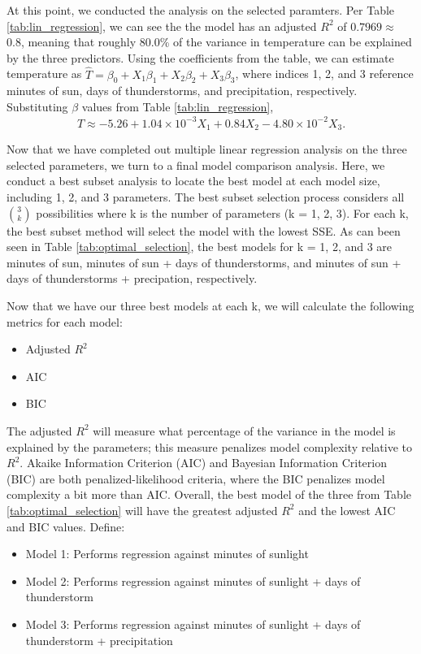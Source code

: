 At this point, we conducted the analysis on the selected paramters. Per Table \ref{tab:lin_regression}, we can see the the model has an adjusted $R^{2}$ of $0.7969 \approx$ 0.8, meaning that roughly 80.0\% of the variance in temperature can be explained by the three predictors. Using the coefficients from the table, we can estimate temperature as $\hat{T} = \beta_{0} + X_{1}\beta_{1} + X_{2}\beta_{2} + X_{3}\beta_{3}$, where indices 1, 2, and 3 reference minutes of sun, days of thunderstorms, and precipitation, respectively. Substituting $\beta$ values from Table \ref{tab:lin_regression}, $$\hat{T} \approx -5.26 + 1.04 \times 10^{-3}X_{1} + 0.84X_{2} - 4.80\times 10^{-2}X_{3}.$$

Now that we have completed out multiple linear regression analysis on the three selected parameters, we turn to a final model comparison analysis. Here, we conduct a best subset analysis to locate the best model at each model size, including 1, 2, and 3 parameters. The best subset selection process considers all $3 \choose k$ possibilities where k is the number of parameters (k = 1, 2, 3). For each k, the best subset method will select the model with the lowest SSE. As can been seen in Table \ref{tab:optimal_selection}, the best models for k = 1, 2, and 3 are minutes of sun, minutes of sun + days of thunderstorms, and minutes of sun + days of thunderstorms + precipation, respectively.

Now that we have our three best models at each k, we will calculate the following metrics for each model: 

\begin{itemize}
	\item Adjusted $R^{2}$
	\item AIC
	\item BIC
\end{itemize}

The adjusted $R^{2}$ will measure what percentage of the variance in the model is explained by the parameters; this measure penalizes model complexity relative to $R^{2}$. Akaike Information Criterion (AIC) and Bayesian Information Criterion (BIC) are both penalized-likelihood criteria, where the BIC penalizes model complexity a bit more than AIC. Overall, the best model of the three from Table \ref{tab:optimal_selection} will have the greatest adjusted $R^{2}$ and the lowest AIC and BIC values. Define: 

\begin{itemize}
	\item Model 1: Performs regression against minutes of sunlight
	\item Model 2: Performs regression against minutes of sunlight + days of thunderstorm
	\item Model 3: Performs regression against minutes of sunlight + days of thunderstorm + precipitation
\end{itemize} 

